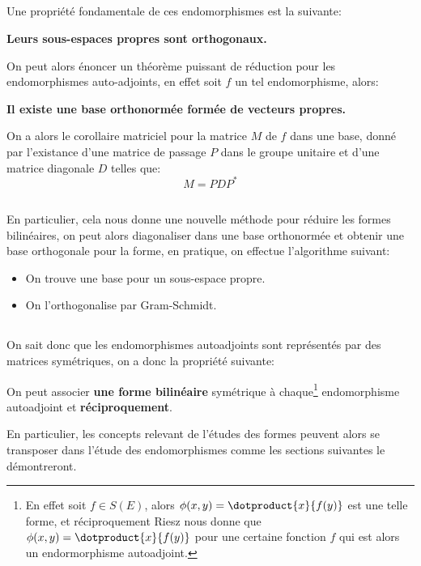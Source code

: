 \subsection*{}
Une propriété fondamentale de ces endomorphismes est la suivante:
\begin{center}
   \textbf{Leurs sous-espaces propres sont orthogonaux.}
\end{center}
On peut alors énoncer un théorème puissant de réduction pour les endomorphismes auto-adjoints, en effet soit \(f\) un tel endomorphisme, alors:
\begin{center}
   \textbf{Il existe une base orthonormée formée de vecteurs propres.}
\end{center}
On a alors le corollaire matriciel pour la matrice \(M\) de \(f\) dans une base, donné par l'existance d'une matrice de passage \(P\) dans le groupe unitaire et d'une matrice diagonale \(D\) telles que:
\[
   M = PDP^*
\]
\subsection*{}
En particulier, cela nous donne une nouvelle méthode pour réduire les formes bilinéaires, on peut alors diagonaliser dans une base orthonormée et obtenir une base orthogonale pour la forme, en pratique, on effectue l'algorithme suivant:
\begin{itemize}
   \item On trouve une base pour un sous-espace propre.
   \item On l'orthogonalise par Gram-Schmidt. 
\end{itemize}
\subsection*{}
On sait donc que les endomorphismes autoadjoints sont représentés par des matrices symétriques, on a donc la propriété suivante:
\begin{center}
   On peut associer \textbf{une forme bilinéaire} symétrique à chaque\footnote[1]{En effet soit \(f \in S(E)\), alors \(\phi(x, y) = \dotproduct{x}{f(y)}\) est une telle forme, et réciproquement Riesz nous donne que \(\phi(x, y) = \dotproduct{x}{f(y)}\) pour une certaine fonction \(f\) qui est alors un endormorphisme autoadjoint.} endomorphisme autoadjoint et \textbf{réciproquement}.
\end{center}
En particulier, les concepts relevant de l'études des formes peuvent alors se transposer dans l'étude des endomorphismes comme les sections suivantes le démontreront.
